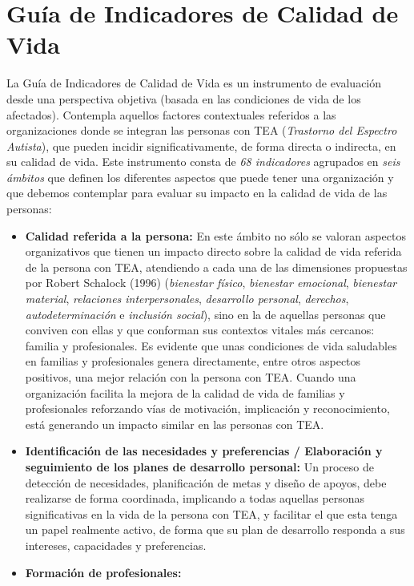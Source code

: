 \section{Guía de Indicadores de Calidad de Vida}
La Guía de Indicadores de Calidad de Vida es un instrumento de evaluación desde
una perspectiva objetiva (basada en las condiciones de vida de los afectados).
Contempla aquellos factores contextuales referidos a las organizaciones donde se
integran las personas con TEA (\textit{Trastorno del Espectro Autista}), que
pueden incidir significativamente, de forma directa o indirecta, en su calidad
de vida. Este instrumento consta de \textit{68 indicadores} agrupados en
\textit{seis ámbitos} que definen los diferentes aspectos que puede tener una
organización y que debemos contemplar para evaluar su impacto en la calidad de
vida de las personas:
\begin{itemize}
	\item \textbf{Calidad referida a la persona: } En este ámbito no sólo se
	valoran aspectos organizativos que tienen un impacto directo sobre la
	calidad de vida referida de la persona con TEA, atendiendo a cada una de las
	dimensiones propuestas por Robert Schalock (1996) (\textit{bienestar
	físico}, \textit{bienestar emocional}, \textit{bienestar material},
	\textit{relaciones interpersonales}, \textit{desarrollo personal},
	\textit{derechos}, \textit{autodeterminación} e \textit{inclusión social}),
	sino en la de aquellas personas que conviven con ellas y que conforman sus
	contextos vitales más cercanos: familia y profesionales. Es evidente que unas
	condiciones de vida saludables en familias y profesionales genera
	directamente, entre otros aspectos positivos, una mejor relación con la
	persona con TEA. Cuando una organización facilita la mejora de la calidad de
	vida de familias y profesionales reforzando vías de motivación, implicación
	y reconocimiento, está generando un impacto similar en las personas con TEA.
	\item \textbf{Identificación de las necesidades y preferencias / Elaboración
	y seguimiento de los planes de desarrollo personal: }
	Un proceso de detección de necesidades, planificación de metas y
	diseño de apoyos, debe realizarse de forma coordinada, implicando a
	todas aquellas personas significativas en la vida de la persona con TEA,
	y facilitar el que esta tenga un papel realmente activo, de forma que su
	plan de desarrollo responda a sus intereses, capacidades y preferencias.
	\item \textbf{Formación de profesionales: }

\end{itemize}
